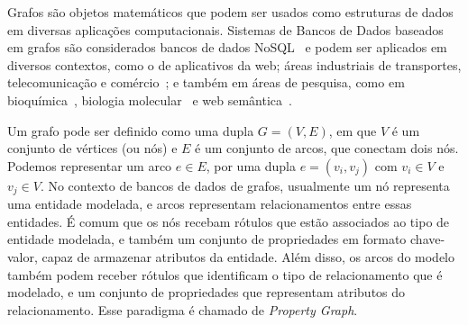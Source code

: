 \documentclass[conference]{IEEEtran}
\begin{document}




Grafos são objetos matemáticos que podem ser usados como estruturas de
dados em diversas aplicações computacionais. Sistemas de Bancos de Dados
baseados em grafos são considerados bancos de dados
NoSQL~\cite{nosqlorg} e podem ser aplicados em diversos contextos, como
o de aplicativos da web; áreas industriais de transportes,
telecomunicação e comércio~\cite{neo4jcustomers}; e também em áreas de
pesquisa, como em bioquímica~\cite{biochem4j}, biologia
molecular~\cite{biomol} e web semântica~\cite{sematicweb}.

Um grafo pode ser definido como uma dupla $G = (V, E)$,
em que $V$ é um conjunto de vértices (ou nós) e $E$ é um conjunto de
arcos, que conectam dois nós. Podemos representar um arco $e \in E$,
por uma dupla $e = (v_i, v_j)$ com $v_i \in V$ e $v_j \in V$. No
contexto de bancos de dados de grafos, usualmente um nó representa
uma entidade modelada, e arcos representam relacionamentos entre essas
entidades. É comum que os nós recebam rótulos que estão associados ao
tipo de entidade modelada, e também um conjunto de propriedades em
formato chave-valor, capaz de armazenar atributos da entidade. Além
disso, os arcos do modelo também podem receber rótulos que identificam
o tipo de relacionamento que é modelado, e um conjunto de propriedades
que representam atributos do relacionamento. Esse paradigma é chamado de
\emph{Property Graph}.
\end{document}

